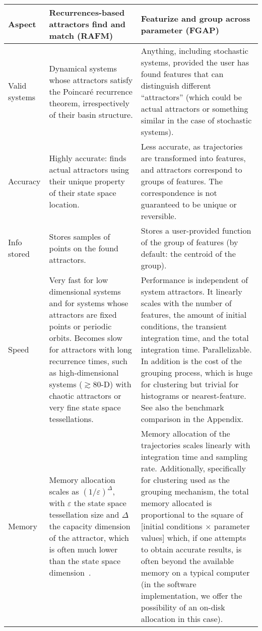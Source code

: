 \documentclass[%
 aip,
 amsmath,amssymb,
 reprint,%
]{revtex4-1}
\begin{document}
 \begin{table*}[!t]
     \centering
     \begin{tabular}{p{1.5cm}p{7.5cm}p{7.5cm}}\toprule
     \textbf{Aspect} & \textbf{Recurrences-based attractors find and match (RAFM)} & \textbf{Featurize and group across parameter (FGAP)} \\ \hline

    Valid systems & Dynamical systems whose attractors satisfy the Poincar\'e recurrence theorem, irrespectively of their basin structure. & Anything, including stochastic systems, provided the user has found features that can distinguish different ``attractors'' (which could be actual attractors or something similar in the case of stochastic systems). \\ 
     
     Accuracy & Highly accurate: finds actual attractors using their unique property of their state space location. & 
     Less accurate, as trajectories are transformed into features, and attractors correspond to groups of features. The correspondence is not guaranteed to be unique or reversible. \\ 
     
     Info stored & Stores samples of points on the found attractors. & Stores a user-provided function of the group of features (by default: the centroid of the group). \\
     
     Speed & Very fast for low dimensional systems and for systems whose attractors are fixed points or periodic orbits. Becomes slow for attractors with long recurrence times, such as high-dimensional systems ($\gtrsim 80$-D) with chaotic attractors or very fine state space tessellations. & Performance is independent of system attractors. It linearly scales with the number of features, the amount of initial conditions, the transient integration time, and the total integration time. Parallelizable. In addition is the cost of the grouping process, which is huge for clustering but trivial for histograms or nearest-feature. See also the benchmark comparison in the Appendix. \\ 
     
     Memory & Memory allocation scales as $(1/\varepsilon)^\Delta$, with $\varepsilon$ the state space tessellation size and $\Delta$ the capacity dimension of the attractor, which is often much lower than the state space dimension~\cite{DatserisBook}. & Memory allocation of the trajectories scales linearly with integration time and sampling rate. Additionally, specifically for clustering used as the grouping mechanism, the total memory allocated is proportional to the square of [initial conditions $\times$ parameter values] which, if one attempts to obtain accurate results, is often beyond the available memory on a typical computer (in the software implementation, we offer the possibility of an on-disk allocation in this case).\\
     

\end{tabular}
\end{table*}
\end{document}
